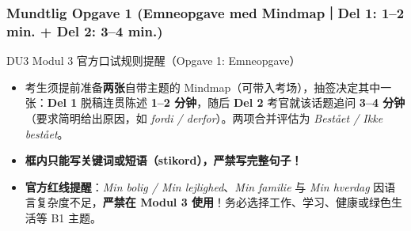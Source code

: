 \subsubsection*{Mundtlig Opgave 1 (Emneopgave med Mindmap｜Del 1: 1--2 min. + Del 2: 3--4 min.)}

\begin{tipbox}{DU3 Modul 3 官方口试规则提醒（Opgave 1: Emneopgave）}
\small
\begin{itemize}
  \item 考生须提前准备\textbf{两张}自带主题的 Mindmap（可带入考场），抽签决定其中一张：\textbf{Del 1} 脱稿连贯陈述 \textbf{1--2 分钟}，随后 \textbf{Del 2} 考官就该话题追问 \textbf{3--4 分钟}（要求简明给出原因，如 \textit{fordi / derfor}）。两项合并评估为 \textit{Bestået / Ikke bestået}。
  \item \textbf{框内只能写关键词或短语（stikord），严禁写完整句子！}
  \item \textbf{官方红线提醒}：\textit{Min bolig / Min lejlighed}、\textit{Min familie} 与 \textit{Min hverdag} 因语言复杂度不足，\textbf{严禁在 Modul 3 使用}！务必选择工作、学习、健康或绿色生活等 B1 主题。
\end{itemize}
\end{tipbox}

